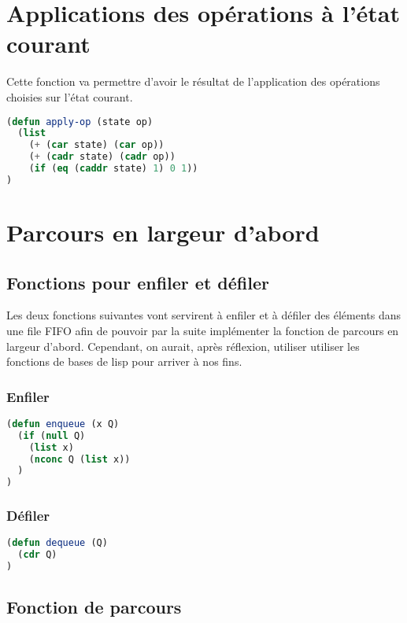 \documentclass[a4paper, 12pt, leqno]{report}
\theoremstyle{plain}
\begin{document}
            \section{Applications des opérations à l'état courant}
            Cette fonction va permettre d'avoir le résultat de l'application des opérations choisies sur l'état courant.
            \begin{lstlisting}[label=some-code,caption=apply-op (state op) ,language=lisp]
(defun apply-op (state op)
  (list 
    (+ (car state) (car op)) 
    (+ (cadr state) (cadr op)) 
    (if (eq (caddr state) 1) 0 1))
)
            \end{lstlisting}
            
            \newpage
            
            \section{Parcours en largeur d'abord} 
            \subsection{Fonctions pour enfiler et défiler}
            Les deux fonctions suivantes vont servirent à enfiler et à défiler des éléments dans une file FIFO afin de pouvoir par la suite implémenter la fonction de parcours en largeur d'abord. Cependant, on aurait, après réflexion, utiliser utiliser les fonctions de bases de lisp pour arriver à nos fins.
            \subsubsection{Enfiler}
            \begin{lstlisting}[label=some-code,caption=enqueue (x Q) ,language=lisp]
(defun enqueue (x Q)
  (if (null Q)
    (list x)
	(nconc Q (list x))
  )
)
            \end{lstlisting}
            \subsubsection{Défiler}
            \begin{lstlisting}[label=some-code,caption=dequeue (Q) ,language=lisp]
(defun dequeue (Q)
  (cdr Q)
)
            \end{lstlisting}
            
            \subsection{Fonction de parcours}
\end{document}
